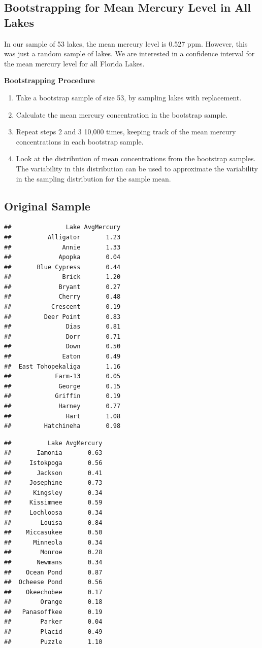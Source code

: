 \documentclass[]{book}
\begin{document}
\subsection{Bootstrapping for Mean Mercury Level in All
Lakes}\label{bootstrapping-for-mean-mercury-level-in-all-lakes}

In our sample of 53 lakes, the mean mercury level is 0.527 ppm. However,
this was just a random sample of lakes. We are interested in a
confidence interval for the mean mercury level for all Florida Lakes.

\textbf{Bootstrapping Procedure}

\begin{enumerate}
\def\labelenumi{\arabic{enumi}.}
\item
  Take a bootstrap sample of size 53, by sampling lakes with
  replacement.
\item
  Calculate the mean mercury concentration in the bootstrap sample.
\item
  Repeat steps 2 and 3 10,000 times, keeping track of the mean mercury
  concentrations in each bootstrap sample.
\item
  Look at the distribution of mean concentrations from the bootstrap
  samples. The variability in this distribution can be used to
  approximate the variability in the sampling distribution for the
  sample mean.
\end{enumerate}

\subsection{Original Sample}\label{original-sample}

\begin{verbatim}
##               Lake AvgMercury
##          Alligator       1.23
##              Annie       1.33
##             Apopka       0.04
##       Blue Cypress       0.44
##              Brick       1.20
##             Bryant       0.27
##             Cherry       0.48
##           Crescent       0.19
##         Deer Point       0.83
##               Dias       0.81
##               Dorr       0.71
##               Down       0.50
##              Eaton       0.49
##  East Tohopekaliga       1.16
##            Farm-13       0.05
##             George       0.15
##            Griffin       0.19
##             Harney       0.77
##               Hart       1.08
##         Hatchineha       0.98
\end{verbatim}

\begin{verbatim}
##          Lake AvgMercury
##       Iamonia       0.63
##     Istokpoga       0.56
##       Jackson       0.41
##     Josephine       0.73
##      Kingsley       0.34
##     Kissimmee       0.59
##     Lochloosa       0.34
##        Louisa       0.84
##    Miccasukee       0.50
##      Minneola       0.34
##        Monroe       0.28
##       Newmans       0.34
##    Ocean Pond       0.87
##  Ocheese Pond       0.56
##    Okeechobee       0.17
##        Orange       0.18
##   Panasoffkee       0.19
##        Parker       0.04
##        Placid       0.49
##        Puzzle       1.10
\end{verbatim}
\end{document}
